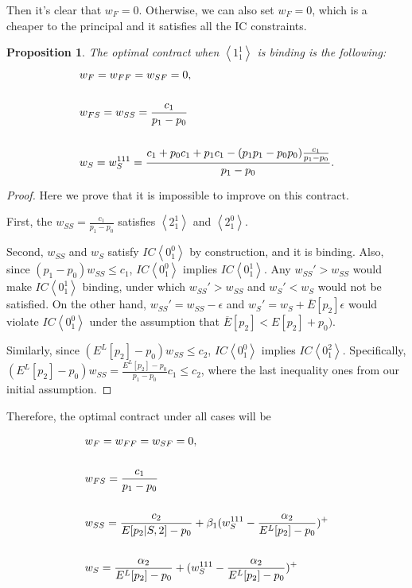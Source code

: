\documentclass[11pt]{article} %
\theoremstyle{exampstyle}
\newtheorem*{proposition*}{Proposition}
\newcommand{\eq}[1]{\begin{align}#1\end{align}}
\newcommand{\la}{ \left < }
\newcommand{\ra}{ \right > }
\begin{document}
Then it's clear that $w_F=0$. Otherwise, we can also set $w_F=0$, which is a cheaper to the principal and it satisfies all the IC constraints.

\begin{proposition*}
The optimal contract when $\la 1^1_1 \ra$ is binding is the following:
\eq{
&w_F=w_{FF}=w_{SF} = 0, \notag \\
\notag \\
&w_{FS} = w_{SS} = \frac{c_1}{p_1-p_0} \notag \\
\notag \\
&w_S=w^{111}_{S} = \frac{c_1 +p_0c_1 +p_1 c_1 - (p_1 p_1 - p_0 p_0) \frac{c_1}{p_1-p_0} }{p_1-p_0}. \notag
}
\end{proposition*}

\begin{proof}

Here we prove that it is impossible to improve on this contract. 

First, the $w_{SS} = \frac{c_1}{p_1 - p_0}$ satisfies $\la 2^1_1\ra$ and $\la 2^0_1\ra$.

Second, $w_{SS}$ and $w_{S}$ satisfy $IC \la 0^0_1 \ra $ by construction, and it is binding. Also, since $(p_1-p_0) w_{SS}  \le c_1$, $IC \la 0^0_1\ra$ implies $IC \la 0^1_1\ra$. Any $w_{SS}'>w_{SS}$ would make $IC \la 0^1_1 \ra$ binding, under which $w_{SS}'>w_{SS}$ and $w_{S}'<w_S$ would not be satisfied. On the other hand, $w_{SS}'=w_{SS} - \epsilon$ and $w_S'=w_S+\overline{E}[p_2] \epsilon$  would violate $IC \la 0^0_1 \ra$ under the assumption that $\overline{E}[p_2] < E[p_2] + p_0)$. 

Similarly, since $(E^L[p_2] - p_0) w_{SS} \le c_2$, $IC \la 0^0_1\ra$ implies $IC \la 0^2_1\ra$. Specifically, $(E^L[p_2] - p_0) w_{SS} = \frac{ E^L[p_2] - p_0}{p_1-p_0}c_1\le c_2$, where the last inequality ones from our initial assumption.                                                    

\end{proof}

Therefore, the optimal contract under all cases will be

\eq{
&w_F=w_{FF}=w_{SF} = 0, \notag \\
\notag \\
&w_{FS} =  \frac{c_1}{p_1-p_0} \notag \\
\notag \\
&w_{SS} =  \frac{c_2}{E[p_2|S,2]-p_0} +\beta_1 (w^{111}_S -\frac{\alpha_2}{E^L[p_2]-p_0} )^+ \notag \\
\notag \\
&w_S=  \frac{\alpha_2}{E^L[p_2]-p_0} + (w^{111}_S -\frac{\alpha_2}{E^L[p_2]-p_0} )^+ \notag 
}
\end{document}

